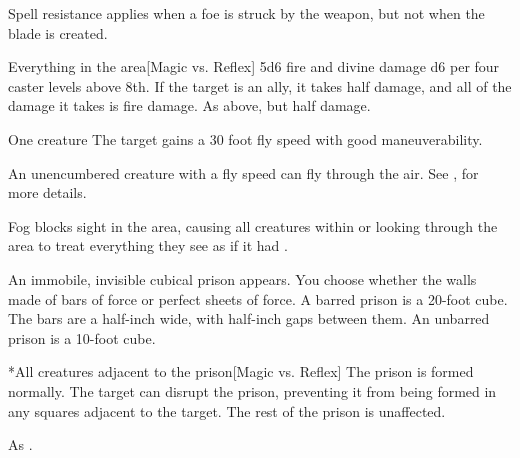 Spell resistance applies when a foe is struck by the weapon, but not when the blade is created.

\spellrng{\rngclose}
\begin{spelltarget}{Everything in the area}[Magic vs. Reflex]
    \spellsuccess 5d6 fire and divine damage \add d6 per four caster levels above 8th. If the target is an ally, it takes half damage, and all of the damage it takes is fire damage.
    \spellfailure As above, but half damage.
\end{spelltarget}
\spellnotes \destructivespellnotes

\firespellnotes

\spellrng{\rngtouch}
\spelldur{\durshort}
\begin{spelltarget}{One creature}
    \spelleffect The target gains a 30 foot fly speed with good maneuverability.
\end{spelltarget}
\spellnotes An unencumbered creature with a fly speed can fly through the air. See , for more details.

\spelldur{\durshort}
\spellline
\spelleffect Fog blocks sight in the area, causing all creatures within or looking through the area to treat everything they see as if it had \concealment.
\spellnotes \fogspellnotes \fogwindspellnotes

\spellrng{\rngmed}
\spelldur{\durlong \dismissable}
\spellline
\spelleffect An immobile, invisible cubical prison appears. You choose whether the walls made of bars of force or perfect sheets of force. A barred prison is a 20-foot cube. The bars are a half-inch wide, with half-inch gaps between them. An unbarred prison is a 10-foot cube.
\begin{spelltarget}*{All creatures adjacent to the prison}[Magic vs. Reflex]
    \spellsuccess The prison is formed normally.
    \spellfailure The target can disrupt the prison, preventing it from being formed in any squares adjacent to the target. The rest of the prison is unaffected.
\end{spelltarget}
\spellnotes As .

